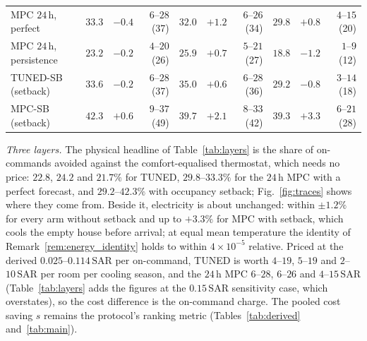 \documentclass[3p,twocolumn,number]{elsarticle}
\newcommand{\SAR}{\text{SAR}}
\begin{document}
\begin{table}[t]
\begin{tabular*}{\textwidth}{@{\extracolsep{\fill}}lrrrrrrrrr@{}}
MPC $24\,$h, perfect & $33.3$ & $-0.4$ & $6$--$28$ (37) & $32.0$ & $+1.2$ & $6$--$26$ (34) & $29.8$ & $+0.8$ & $4$--$15$ (20) \\
MPC $24\,$h, persistence & $23.2$ & $-0.2$ & $4$--$20$ (26) & $25.9$ & $+0.7$ & $5$--$21$ (27) & $18.8$ & $-1.2$ & $1$--$9$ (12) \\
TUNED-SB (setback) & $33.6$ & $-0.2$ & $6$--$28$ (37) & $35.0$ & $+0.6$ & $6$--$28$ (36) & $29.2$ & $-0.8$ & $3$--$14$ (18) \\
MPC-SB (setback) & $42.3$ & $+0.6$ & $9$--$37$ (49) & $39.7$ & $+2.1$ & $8$--$33$ (42) & $39.3$ & $+3.3$ & $6$--$21$ (28) \\
\bottomrule
\end{tabular*}
\end{table}

\emph{Three layers.} The physical headline of Table~\ref{tab:layers} is the share of on-commands avoided against the comfort-equalised thermostat, which needs no price: $22.8$, $24.2$ and $21.7\%$ for TUNED, $29.8$--$33.3\%$ for the $24\,$h MPC with a perfect forecast, and $29.2$--$42.3\%$ with occupancy setback; Fig.~\ref{fig:traces} shows where they come from. Beside it, electricity is about unchanged: within $\pm1.2\%$ for every arm without setback and up to $+3.3\%$ for MPC with setback, which cools the empty house before arrival; at equal mean temperature the identity of Remark~\ref{rem:energy_identity} holds to within $4\times10^{-5}$ relative. Priced at the derived $0.025$--$0.114\,\SAR$ per on-command, TUNED is worth $4$--$19$, $5$--$19$ and $2$--$10\,\SAR$ per room per cooling season, and the $24\,$h MPC $6$--$28$, $6$--$26$ and $4$--$15\,\SAR$ (Table~\ref{tab:layers} adds the figures at the $0.15\,\SAR$ sensitivity case, which overstates), so the cost difference is the on-command charge. The pooled cost saving $s$ remains the protocol's ranking metric (Tables~\ref{tab:derived} and~\ref{tab:main}).


\end{document}
